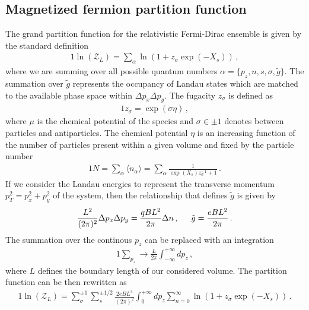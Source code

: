 \subsection{Magnetized fermion partition function}
\label{sec:partition}
The grand partition function for the relativistic Fermi-Dirac ensemble is given by the standard definition
\begin{alignat}{1}
    \label{PartFunc} \ln\left(\mathcal{Z}_{L}\right)=\sum_{\alpha}\ln\left(1+z_{\sigma}\exp(-X_{s})\right)\,,
\end{alignat}
where we are summing over all possible quantum numbers $\alpha = \{p_{z},n,s,\sigma,\tilde{g}\}$. The summation over $\tilde{g}$ represents the occupancy of Landau states which are matched to the available phase space within $\Delta p_{x}\Delta p_{y}$. The fugacity $z_{\sigma}$ is defined as
\begin{alignat}{1}
    \label{Fugacity} z_{\sigma}=\exp\left(\sigma\eta\right)\,,
\end{alignat}
where $\mu$ is the chemical potential of the species and $\sigma\in\pm1$ denotes between particles and antiparticles. The chemical potential $\eta$ is an increasing function of the number of particles present within a given volume and fixed by the particle number
\begin{alignat}{1}
  \label{Number} N=\sum_{\alpha}\langle n_{\alpha}\rangle=\sum_{\alpha}\frac{1}{\exp(X_{s})z_{\sigma}^{-1}+1}\,.
\end{alignat}
If we consider the Landau energies to represent the transverse momentum $p_{T}^{2}=p_{x}^{2}+p_{y}^{2}$ of the system, then the relationship that defines $\tilde{g}$ is given by
\begin{alignat}{1}
    \label{PhaseSpace} \frac{L^{2}}{(2\pi)^{2}}\Delta p_{x}\Delta p_{y}=\frac{qBL^{2}}{2\pi}\Delta n\,,\indent \tilde{g}=\frac{eBL^{2}}{2\pi}\,.
\end{alignat}
The summation over the continous $p_{z}$ can be replaced with an integration
\begin{alignat}{1}
    \label{pzInt} \sum_{p_{z}}\rightarrow\frac{L}{2\pi}\int^{+\infty}_{-\infty}dp_{z}\,,
\end{alignat}
where $L$ defines the boundary length of our considered volume. The partition function  can be then rewritten as
\begin{alignat}{1}
    \label{PartFuncOne} \ln\left(\mathcal{Z}_{L}\right)=\sum_{\sigma}^{\pm1}\sum_{s}^{\pm1/2}\frac{2eBL^{3}}{(2\pi)^{2}}\int^{+\infty}_{0}dp_{z}\sum_{n=0}^{\infty}\ln\left(1+z_{\sigma}\exp(-X_{s})\right)\,.
\end{alignat}

